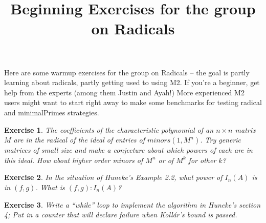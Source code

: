 \documentclass[11pt, oneside]{article}   	%
\title{Beginning Exercises for the group on Radicals}
\author{}
\newtheorem{exercise}{Exercise}
\begin{document}
\maketitle
Here are some warmup exercises for the group on Radicals -- the goal is partly learning about radicals, partly getting used to using M2. If you're a beginner, get help from the experts (among them Justin and Ayah!) More experienced M2 users might want to start right away to make some benchmarks for testing radical and minimalPrimes strategies.

\begin{exercise}
The coefficients of the characteristic polynomial of an $n\times n$ matrix $M$ are in the radical of the ideal of entries of $minors(1, M^{n})$. Try generic matrices of small size
and make a conjecture about which powers of each are in this ideal. How about higher order minors of $M^{n}$ or of $M^{k}$ for other $k$? 
\end{exercise}

\begin{exercise}
In the situation of Huneke's Example 2.2, what power of $I_{n}(A)$ is in $(f,g)$. What is $(f,g): I_{n}(A)$?
\end{exercise}

\begin{exercise}
Write a ``while'' loop to implement the algorithm in Huneke's section 4; Put in a counter that will declare failure when Koll\'ar's bound is passed.
\end{exercise}
\maketitle
\end{document}
